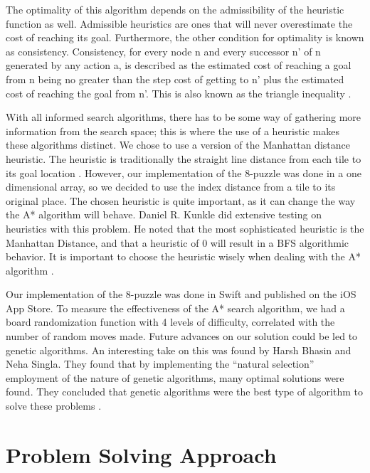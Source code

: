 \documentclass[titlepage]{article}
\begin{document}
The optimality of this algorithm depends on the admissibility of the heuristic function as well. Admissible heuristics are ones that will never overestimate the cost of reaching its goal. Furthermore, the other condition for optimality is known as consistency. Consistency, for every node n and every successor n’ of n generated by any action a,  is described as the estimated cost of reaching a goal from n being no greater than the step cost of getting to n’ plus the estimated cost of reaching the goal from n’. This is also known as the triangle inequality \cite{russell2002artificial}.
\newline

With all informed search algorithms, there has to be some way of gathering more information from the search space; this is where the use of a heuristic makes these algorithms distinct. We chose to use a version of the Manhattan distance heuristic. The heuristic is traditionally the straight line distance from each tile to its goal location \cite{burns2012implementing}. However, our implementation of the 8-puzzle was done in a one dimensional array, so we decided to use the index distance from a tile to its original place. The chosen heuristic is quite important, as it can change the way the A* algorithm will behave. Daniel R. Kunkle did extensive testing on heuristics with this problem. He noted that the most sophisticated heuristic is the Manhattan Distance, and that a heuristic of 0 will result in a BFS algorithmic behavior. It is important to choose the heuristic wisely when dealing with the A* algorithm \cite{kunkle2001solving}.
\newline

Our implementation of the 8-puzzle was done in Swift and published on the iOS App Store. To measure the effectiveness of the A* search algorithm, we had a board randomization function with 4 levels of difficulty, correlated with the number of random moves made. Future advances on our solution could be led to genetic algorithms. An interesting take on this was found by Harsh Bhasin and Neha Singla. They found that by implementing the “natural selection” employment of the nature of genetic algorithms, many optimal solutions were found. They concluded that genetic algorithms were the best type of algorithm to solve these problems \cite{bhasin2012genetic}.

\newpage

\section{Problem Solving Approach}
\end{document}
